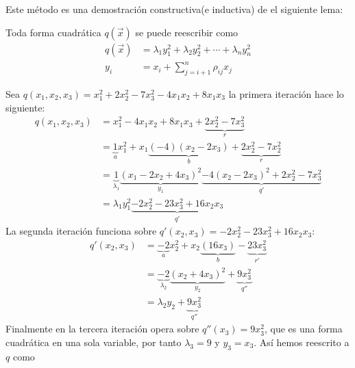 Este método es una demostración constructiva(e inductiva) de el siguiente lema:
\begin{lemma}
Toda forma cuadrática $q\left(\overrightarrow{x}\right)$ se puede reescribir como
\begin{equation}
\begin{split}
q\left(\overrightarrow{x}\right) & =\lambda_{1}y_{1}^{2} + \lambda_{2}y_{2}^{2} + \cdots + \lambda_{n}y_{n}^{2}\\
y_{i} & = x_{i} + \sum_{j=i+1}^{n}\rho_{ij}x_{j}
\end{split}
\label{ecuacion:2.3}
\end{equation}
\label{lema:2.3}
\end{lemma}

\newpage
\begin{example}
Sea $q\left(x_{1}, x_{2}, x_{3}\right) = x_{1}^{2} + 2x_{2}^{2} - 7x_{3}^{2} - 4x_{1}x_{2} + 8x_{1}x_{3}$ la primera iteración hace lo siguiente:
 \begin{equation*}
\begin{split}
q\left(x_{1}, x_{2}, x_{3}\right) & = x_{1}^{2} - 4x_{1}x_{2} + 8x_{1}x_{3} +  \underbrace{2x_{2}^{2} - 7x_{3}^{2}}_{r}\\
 & = \underbrace{1}_{a}x_{1}^{2} + x_{1} \underbrace{\left(-4\right)\left(x_{2} - 2x_{3}\right)}_{b} + \underbrace{2x_{2}^{2} - 7x_{2}^{2}}_{r}\\
 & = \underbrace{1}_{\lambda_{1}} \underbrace{\left(x_{1} - 2x_{2} + 4x_{3}\right)^{2}}_{y_{1}} \underbrace{- 4\left(x_{2} - 2x_{3}\right)^{2} + 2x_{2}^{2} - 7x_{3}^{2}}_{q'}\\
 & = \lambda_{1}y_{1}^{2} \underbrace{- 2x_{2}^{2} - 23x_{3}^{2} + 16x_{2}x_{3}}_{q'}
\end{split}
\end{equation*}
La segunda iteración funciona sobre $q'\left(x_{2}, x_{3} \right) = -2x_{2}^{2} - 23x_{3}^{2} + 16x_{2}x_{3}$:
\begin{equation*}
\begin{split}
q'\left(x_{2}, x_{3}\right) & = \underbrace{-2}_{a}x_{2}^{2} + x_{2}\underbrace{\left(16x_{3}\right)}_{b} - \underbrace{23x_{3}^{2}}_{r'}\\
 & = \underbrace{-2}_{\lambda_{2}}\underbrace{\left(x_{2} + 4x_{3}\right)^{2}}_{y_{2}} + \underbrace{9x_{3}^{2}}_{q''}\\
 & = \lambda_{2}y_{2} + \underbrace{9x_{3}^{2}}_{q''}
\end{split}
\end{equation*}
Finalmente en la tercera iteración opera sobre $q''\left(x_{3}\right) = 9x_{3}^{2}$, que es una forma cuadrática en una sola variable, por tanto $\lambda_{3} = 9$ y $y_{3} = x_{3}$. Así hemos reescrito a $q$ como 

\end{example}
